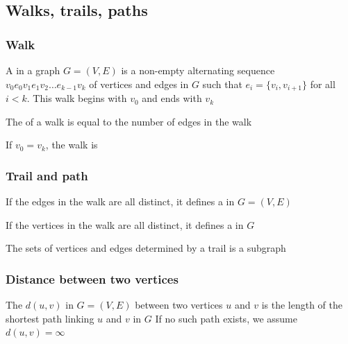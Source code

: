\documentclass[aspectratio=169]{beamer}\usepackage[]{graphicx}\usepackage[]{xcolor}
\begin{document}



\subsection{Walks, trails, paths}


\begin{frame}\frametitle{Walk}
\begin{definition}[{Walk}]
A  in a graph $G=(V,E)$ is a non-empty alternating sequence $v_0 e_0 v_1 e_1 v_2 \dots e_{k-1} v_k$ of vertices and edges in $G$ such that $e_i=\{v_i, v_{i+1}\}$ for all $i<k$. 
This walk begins with $v_0$ and ends with $v_k$
\end{definition}
\vfill
\begin{definition}
The  of a walk is equal to the number of edges in the walk
\end{definition}
\vfill
\begin{definition}
If $v_0=v_k$, the walk is 
\end{definition}
\end{frame}


\begin{frame}\frametitle{Trail and path}
\begin{definition}[{Trail}]
If the edges in the walk are all distinct, it defines a  in $G=(V,E)$
\end{definition}
\vfill
\begin{definition}[{Path}]\label{def:path}
If the vertices in the walk are all distinct, it defines a  in $G$
\end{definition}
\vfill
The sets of vertices and edges determined by a trail is a subgraph
\end{frame}


\begin{frame}\frametitle{Distance between two vertices}
\begin{definition}
The  $d(u,v)$ in $G=(V,E)$ between two vertices $u$ and $v$ is the length of the shortest path linking $u$ and $v$ in $G$
\vskip0.2cm
If no such path exists, we assume $d(u,v)=\infty$
\end{definition}
\end{frame}
\end{document}
